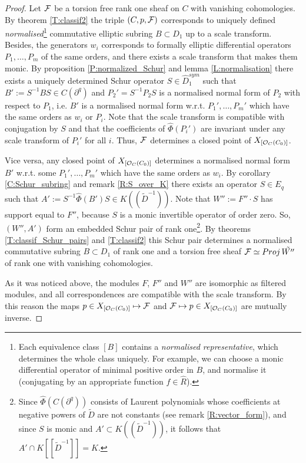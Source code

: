 \documentclass[11pt]{article}
\theoremstyle{definition}
\newcommand{\Projj}{\mathop {\rm Proj}}
\theoremstyle{plain}
\numberwithin{equation}{section}
\newcommand{\co}{{{\cal O}}}
\newcommand{\cf}{{{\cal F}}}
\begin{document}
\begin{proof}
Let $\cf$ be a  torsion free rank one sheaf on $C$ with vanishing cohomologies. 
By theorem \ref{T:classif2} the triple $(C,p,\cf )$ corresponds to uniquely defined {\it normalised}\footnote{Each equivalence class $[B]$ contains a {\it normalised representative}, which determines the whole class uniquely. For example, we can choose a monic differential operator of minimal positive order in $B$, and normalise it (conjugating by an appropriate function $f\in \hat{R}$).} commutative elliptic subring $B\subset D_1$ up to a scale transform. Besides, the generators $w_i$ corresponds to formally elliptic differential operators $P_1, \ldots ,P_m$ of the same orders, and there exists a scale transform that makes them monic. By  proposition \ref{P:normalized_Schur} and lemma \ref{L:normalisation} there exists a uniquely determined Schur operator $S\in \hat{D}_1^{sym}$ such that $B':=S^{-1}BS\in C(\partial^q)$ and $P_2'=S^{-1}P_2S$ is a normalised normal form of $P_2$ with respect to $P_1$, i.e. $B'$ is a normalised normal form w.r.t. $P_1', \ldots ,P_m'$ which have the same orders as $w_i$ or $P_i$. Note that the scale transform is compatible with conjugation by $S$ and that the coefficients of $\hat{\Phi}(P_i')$ are invariant under any scale transform of $P_i'$ for all $i$. Thus, $\cf$ determines a closed point of $X_{[\co_C(C_0)]}$.

Vice versa, any closed point of $X_{[\co_C(C_0)]}$ determines a normalised normal form $B'$ w.r.t. some $P_1', \ldots ,P_m'$ which have the same orders as $w_i$. By corollary \ref{C:Schur_subring} and remark \ref{R:S_over_K} there exists an operator $S\in E_q$ such that $A':=S^{-1}\hat{\Phi}(B')S\in K((\tilde{D}^{-1}))$. Note that $W'':=F''\cdot S$ has support equal to $F''$, because $S$ is a monic invertible operator of order zero. So, $(W'', A')$ form an embedded Schur pair of rank one\footnote{Since  $\hat{\Phi}(C(\partial^q))$  consists of Laurent polynomials whose coefficients at negative powers of $\tilde{D}$ are not constants (see remark \ref{R:vector_form}), and since $S$ is monic and $A'\subset K((\tilde{D}^{-1}))$, it follows that $A'\cap K[[\tilde{D}^{-1}]]=K$.}. By theorems \ref{T:classif_Schur_pairs} and \ref{T:classif2} this Schur pair determines a normalised commutative subring $B\subset D_1$ of rank one and a torsion free sheaf $\cf\simeq \Projj \tilde{W''}$ of rank one with vanishing cohomologies. 

As it was noticed above, the modules $F$, $F''$ and $W''$ are isomorphic as filtered modules, and all correspondences are compatible with the scale transform. By this reason the maps $p\in X_{[\co_C(C_0)]} \mapsto \cf$ and $\cf \mapsto p\in X_{[\co_C(C_0)]}$ are mutually inverse. 
\end{proof}
\end{document}
